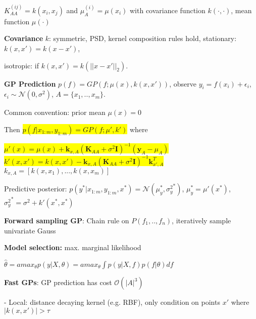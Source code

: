 \documentclass[11pt,landscape,a4paper,fleqn]{article}
\newcommand{\mhl}[1]{\setlength{\fboxsep}{0pt}\colorbox{yellow}{#1}}
\begin{document}
\begin{multicols*}{4}
$K_{AA}^{(ij)} = k(x_i, x_j)$ and $\mu_A^{(i)} = \mu(x_i)$ with covariance function $k(\cdot, \cdot)$, mean function $\mu(\cdot)$


\textbf{Covariance} $k$: symmetric, PSD, kernel composition rules hold,
stationary: $k(x,x') = k(x - x')$,

isotropic: if $k(x,x') = k(||x - x'||_2)$.


\textbf{GP Prediction} $p(f) = GP(f; \mu(x), k(x,x'))$, observe $y_i = f(x_i) + \epsilon_i$, $\epsilon_i \sim \mathcal{N}(0, \sigma^2)$, \mbox{\fontsize{9.2}{6}\selectfont $A = \{x_1,..,x_m\}$}.

Common convention: prior mean $\mu(x) = 0$

Then \mhl{$p(f | x_{1:m}, y_{1:m}) = GP(f; \mu', k')$} where

\mhl{$\mu'(x) = \mu(x) + \mathbf{k}_{x,A} (\mathbf{K}_{AA} + \sigma^2 \mathbf{I})^{-1} (\mathbf{y}_A - \mu_A)$}
\mhl{$k'(x,x') = k(x, x') - \mathbf{k}_{x,A} (\mathbf{K}_{AA} + \sigma^2 \mathbf{I})^{-1} \mathbf{k}_{x',A}^T$}
$k_{x,A} = [k(x, x_1),..., k(x, x_m)]$

Predictive posterior: $p(y^* | x_{1:m}, y_{1:m},x^*) = \mathcal{N}(\mu_y^*, {\sigma_y^2}^*)$, $\mu_y^* = \mu'(x^*)$, ${\sigma_y^2}^* = \sigma^2 + k'(x^*, x^*)$

\textbf{Forward sampling GP}: Chain rule on $P(f_1,..,f_n)$, iteratively sample univariate Gauss

\textbf{Model selection:} max. marginal likelihood

$\hat{\theta} = amax_\theta p(y | X, \theta) = amax_\theta \int p(y | X,f) p(f | \theta) df$




\textbf{Fast GPs}: GP prediction has cost $\mathcal{O}(|A|^3)$

- Local: distance decaying kernel (e.g. RBF), only condition on points $x'$ where $|k(x,x')| > \tau$


\end{multicols*}
\end{document}

